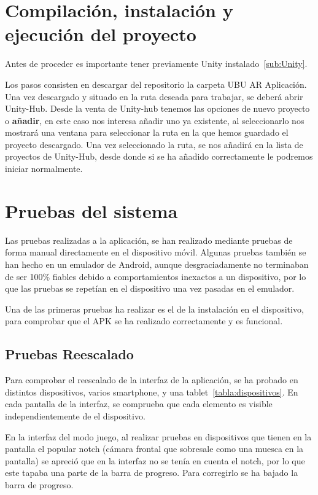 \section{Compilación, instalación y ejecución del proyecto}
Antes de proceder es importante tener previamente Unity instalado~\ref{sub:Unity}.


Los pasos consisten en descargar del repositorio la carpeta UBU AR Aplicación. Una vez descargado y situado en la ruta deseada para trabajar, se deberá abrir Unity-Hub. Desde la venta de Unity-hub tenemos las opciones de nuevo proyecto o \textbf{añadir}, en este caso nos interesa añadir uno ya existente, al seleccionarlo nos mostrará una ventana para seleccionar la ruta en la que hemos guardado el proyecto descargado. Una vez seleccionado la ruta, se nos añadirá en la lista de proyectos de Unity-Hub, desde donde si se ha añadido correctamente le podremos iniciar normalmente.




\section{Pruebas del sistema}
Las pruebas realizadas a la aplicación, se han realizado mediante pruebas de forma manual directamente en el dispositivo móvil. Algunas pruebas también se han hecho en un emulador de Android, aunque desgraciadamente no terminaban de ser 100\% fiables debido a comportamientos inexactos a un dispositivo, por lo que las pruebas se repetían en el dispositivo una vez pasadas en el emulador. 

Una de las primeras pruebas ha realizar es el de la instalación en el dispositivo, para comprobar que el APK se ha realizado correctamente y es funcional. 

\subsection{Pruebas Reescalado}
Para comprobar el reescalado de la interfaz de la aplicación, se ha probado en distintos dispositivos, varios smartphone, y una tablet~\ref{tabla:dispositivos}. En cada pantalla de la interfaz, se comprueba que cada elemento es visible independientemente de el dispositivo.

En la interfaz del modo juego, al realizar pruebas en dispositivos que tienen en la pantalla el popular notch (cámara frontal que sobresale como una muesca en la pantalla) se apreció que en la interfaz no se tenía en cuenta el notch, por lo que este tapaba una parte de la barra de progreso. Para corregirlo se ha bajado la barra de progreso.

